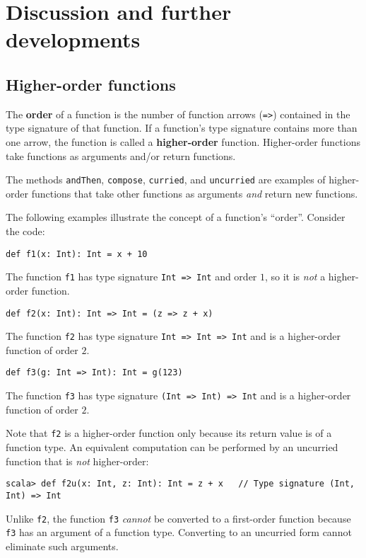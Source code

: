 \section{Discussion and further developments}

\subsection{Higher-order functions}

The \textbf{order} of a function is the
number of function arrows (\lstinline!=>!) contained in the type
signature of that function. If a function\textsf{'}s type signature contains
more than one arrow, the function is called a \textbf{higher-order}
function. Higher-order functions take functions as arguments and/or
return functions.

The methods \lstinline!andThen!, \lstinline!compose!, \lstinline!curried!,
and \lstinline!uncurried! are examples of higher-order functions
that take other functions as arguments \emph{and} return new functions.

The following examples illustrate the concept of a function\textsf{'}s \textsf{``}order\textsf{''}.
Consider the code:
\begin{lstlisting}
def f1(x: Int): Int = x + 10
\end{lstlisting}
The function \texttt{}\lstinline!f1! has type signature \texttt{}\lstinline!Int => Int!
and order $1$, so it is \emph{not} a higher-order function.
\begin{lstlisting}
def f2(x: Int): Int => Int = (z => z + x)
\end{lstlisting}
The function \texttt{}\lstinline!f2! has type signature \texttt{}\lstinline!Int => Int => Int!
and is a higher-order function of order $2$. 
\begin{lstlisting}
def f3(g: Int => Int): Int = g(123)
\end{lstlisting}
The function \texttt{}\lstinline!f3! has type signature \texttt{}\lstinline!(Int => Int) => Int!
and is a higher-order function of order $2$.

Note that \texttt{}\lstinline!f2! is a higher-order function only
because its return value is of a function type. An equivalent computation
can be performed by an uncurried function that is \emph{not} higher-order:
\begin{lstlisting}
scala> def f2u(x: Int, z: Int): Int = z + x   // Type signature (Int, Int) => Int
\end{lstlisting}
Unlike \lstinline!f2!, the function \lstinline!f3! \emph{cannot}
be converted to a first-order function because \lstinline!f3! has
an argument of a function type. Converting to an uncurried form cannot
eliminate such arguments.

